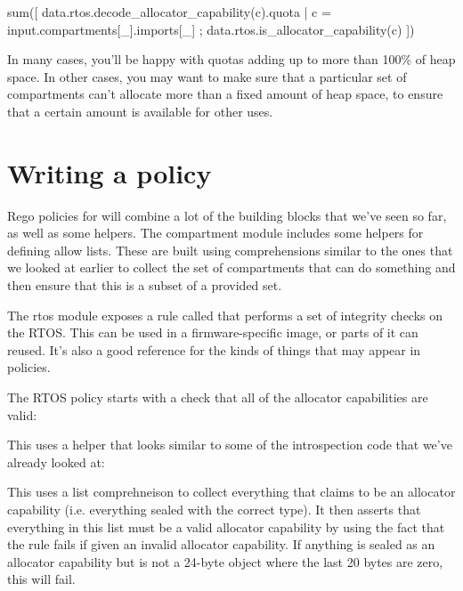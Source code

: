 {\begin{regosnippet}
sum([ data.rtos.decode_allocator_capability(c).quota |
    c = input.compartments[_].imports[_] ;
    data.rtos.is_allocator_capability(c) ])
\end{regosnippet}

In many cases, you'll be happy with quotas adding up to more than 100\% of heap space.
In other cases, you may want to make sure that a particular set of compartments can't allocate more than a fixed amount of heap space, to ensure that a certain amount is available for other uses.

\section{Writing a policy}

Rego policies for  will combine a lot of the building blocks that we've seen so far, as well as some helpers.
The compartment module includes some helpers for defining allow lists.
These are built using comprehensions similar to the ones that we looked at earlier to collect the set of compartments that can do something and then ensure that this is a subset of a provided set.

The rtos module exposes a rule called  that performs a set of integrity checks on the RTOS.
This can be used in a firmware-specific image, or parts of it can reused.
It's also a good reference for the kinds of things that may appear in policies.

The RTOS policy starts with a check that all of the allocator capabilities are valid:

\regolisting[filename=examples/auditing-rtos/rtos.rego,marker=allsealedvalid,label=lst:allsealedvalid,caption="The Rego expression checking that all sealed allocator capabilities are valid"]{}

This uses a helper that looks similar to some of the introspection code that we've already looked at:

\regolisting[filename=examples/auditing-rtos/rtos.rego,marker=allsealedvalidimpl,label=lst:allsealedvalidimpl,caption="The Rego rule implementing the check that all sealed allocator capabilities are valid"]{}

This uses a list comprehneison to collect everything that claims to be an allocator capability (i.e. everything sealed with the correct type).
It then asserts that everything in this list must be a valid allocator capability by using the fact that the  rule fails if given an invalid allocator capability.
If anything is sealed as an allocator capability but is not a 24-byte object where the last 20 bytes are zero, this will fail.

}
